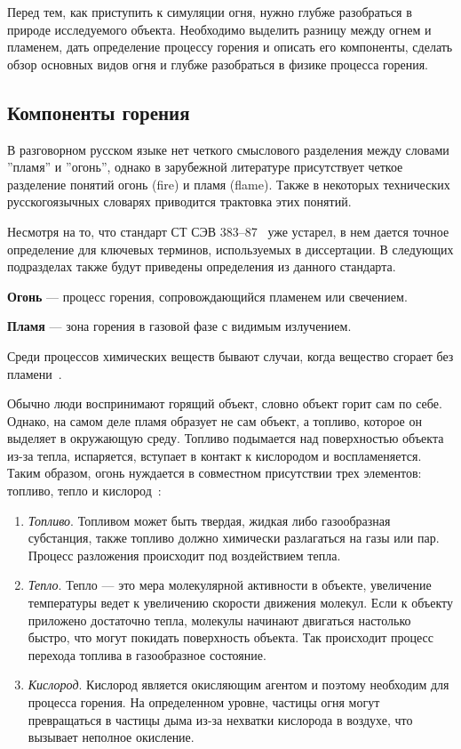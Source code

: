 Перед тем, как приступить к симуляции огня, нужно глубже разобраться в природе
исследуемого объекта. Необходимо выделить разницу между огнем и пламенем,
дать определение процессу горения и описать его компоненты, сделать обзор
основных видов огня и глубже разобраться в физике процесса горения.

\subsection{Компоненты горения}

В разговорном русском языке нет четкого смыслового разделения между словами
''пламя'' и ''огонь''\cite{WikiFlame}, однако в зарубежной литературе
присутствует четкое разделение понятий огонь (fire) и пламя (flame). Также в
некоторых технических русскогоязычных словарях приводится трактовка этих
понятий.

Несмотря на то, что стандарт СТ СЭВ 383--87~\cite{383-87} уже устарел, в нем
дается точное определение для ключевых терминов, используемых в диссертации. В
следующих подразделах также будут приведены определения из данного стандарта.

\textbf{Огонь} --- процесс горения, сопровождающийся пламенем или свечением.

\textbf{Пламя} --- зона горения в газовой фазе с видимым излучением.

Среди процессов химических веществ бывают случаи, когда вещество сгорает без
пламени~\cite{WikiFire}.

Обычно люди воспринимают горящий объект, словно объект горит сам по себе.
Однако, на самом деле пламя образует не сам объект, а топливо, которое он
выделяет в окружающую среду. Топливо подымается над поверхностью объекта из-за
тепла, испаряется, вступает в контакт к кислородом и воспламеняется. Таким
образом, огонь нуждается в совместном присутствии трех элементов: топливо, тепло
и кислород~\cite{USArmy}:
\begin{enumerate}
    \item \emph{Топливо}. Топливом может быть твердая, жидкая либо газообразная
        субстанция, также топливо должно химически разлагаться на газы или
        пар. Процесс разложения происходит под воздействием тепла.
    \item \emph{Тепло}. Тепло --- это мера молекулярной активности в объекте,
        увеличение температуры ведет к увеличению скорости движения молекул.
        Если к объекту приложено достаточно тепла, молекулы начинают двигаться
        настолько быстро, что могут покидать поверхность объекта. Так происходит
        процесс перехода топлива в газообразное состояние.
    \item \emph{Кислород}. Кислород является окисляющим агентом и поэтому
        необходим для процесса горения. На определенном уровне, частицы огня
        могут превращаться в частицы дыма из-за нехватки кислорода в воздухе,
        что вызывает неполное окисление.
\end{enumerate}


